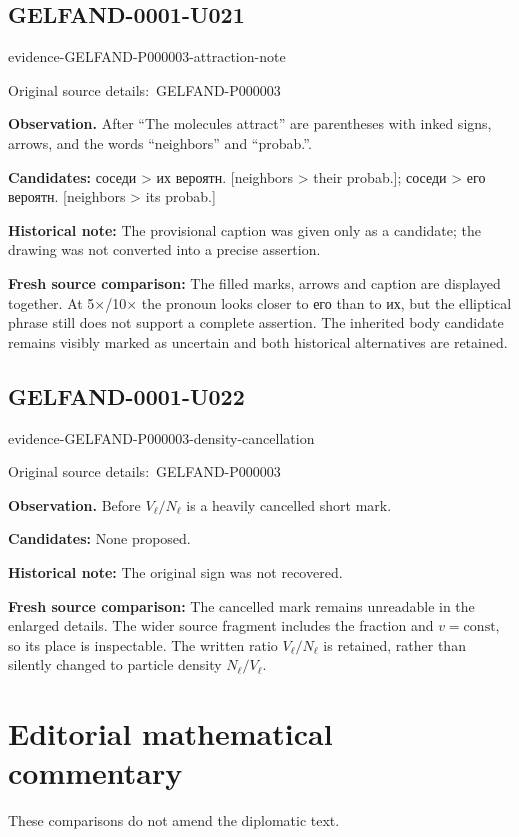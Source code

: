 \documentclass[11pt]{article}
\newcommand{\EvidenceBlock}[4]{%
 \par\smallskip\noindent\begin{minipage}{\linewidth}
 \begin{minipage}[t]{.47\linewidth}\vspace{0pt}\centering
 \csname evidence-#1-#2\endcsname\par
 {\scriptsize\SourceCropCaption\ #1}\par
 \end{minipage}\hfill
 \begin{minipage}[t]{.49\linewidth}\vspace{0pt}\raggedright
 {\small\color{orange!65!black}\textbf{#4} #3}\par
 \end{minipage}
 \end{minipage}\par\smallskip}
\newcommand{\SourceCropCaption}{Original source details:}\newcommand{\ReadingCaption}{Uncertain reading.}\newcommand{\IncompleteCaption}{Undeciphered passage.}\newcommand{\DiagramCaption}{Diagram and typed description.}
\begin{document}
\subsection*{GELFAND-0001-U021}
\EvidenceBlock{GELFAND-P000003}{attraction-note}{After “The molecules attract” are parentheses with inked signs, arrows, and the words “neighbors” and “probab.”.}{Observation.}
\par\smallskip\noindent\textbf{Candidates: } соседи > их вероятн. [neighbors > their probab.]; соседи > его вероятн. [neighbors > its probab.]\par
\par\smallskip\noindent\textbf{Historical note: } The provisional caption was given only as a candidate; the drawing was not converted into a precise assertion.\par
\par\smallskip\noindent\textbf{Fresh source comparison: } The filled marks, arrows and caption are displayed together. At 5×/10× the pronoun looks closer to его than to их, but the elliptical phrase still does not support a complete assertion. The inherited body candidate remains visibly marked as uncertain and both historical alternatives are retained.\par

\subsection*{GELFAND-0001-U022}
\EvidenceBlock{GELFAND-P000003}{density-cancellation}{Before \(V_\ell/N_\ell\) is a heavily cancelled short mark.}{Observation.}
\par\smallskip\noindent\textbf{Candidates: } None proposed.\par
\par\smallskip\noindent\textbf{Historical note: } The original sign was not recovered.\par
\par\smallskip\noindent\textbf{Fresh source comparison: } The cancelled mark remains unreadable in the enlarged details. The wider source fragment includes the fraction and \(v=\mathrm{const}\), so its place is inspectable. The written ratio \(V_\ell/N_\ell\) is retained, rather than silently changed to particle density \(N_\ell/V_\ell\).\par

\clearpage\section*{Editorial mathematical commentary}
These comparisons do not amend the diplomatic text.
\end{document}
